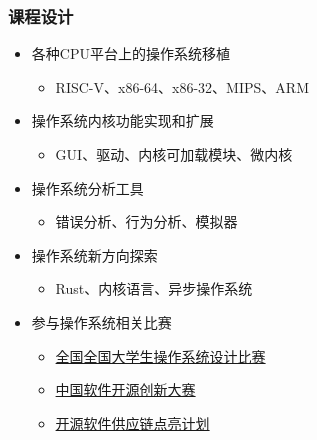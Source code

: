 \begin{frame}
\frametitle{课程设计}
	\begin{itemize}
	\item 各种CPU平台上的操作系统移植
		\begin{itemize}	
		\item RISC-V、x86-64、x86-32、MIPS、ARM
		\end{itemize}
	\item 操作系统内核功能实现和扩展
		\begin{itemize}	
		\item GUI、驱动、内核可加载模块、微内核
		\end{itemize} \pause
	\item 操作系统分析工具	
		\begin{itemize}	
		\item 错误分析、行为分析、模拟器
		\end{itemize}
	\item 操作系统新方向探索
		\begin{itemize}	
		\item Rust、内核语言、异步操作系统
		\end{itemize} \pause
	\item 参与操作系统相关比赛

		\begin{itemize}	
		\item \href{https://github.com/oscomp/os-competition-info}{全国全国大学生操作系统设计比赛}
		\item \href{https://www.opengcc.org/article/63/270.html}{中国软件开源创新大赛}
        \item \href{https://summer.iscas.ac.cn/#/org/projectlist}{开源软件供应链点亮计划}
		\end{itemize}
	\end{itemize}
\end{frame}
    
